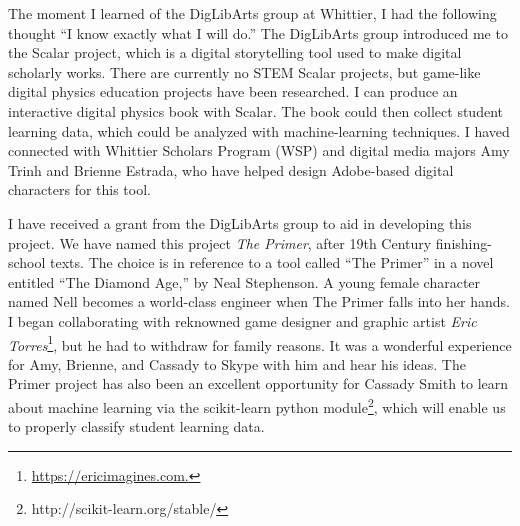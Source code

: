 \documentclass[../../main.tex]{subfiles}
\begin{document}
The moment I learned of the DigLibArts group at Whittier, I had the following thought ``I know exactly what I will do.''  The DigLibArts group introduced me to the Scalar project, which is a digital storytelling tool used to make digital scholarly works.  There are currently no STEM Scalar projects, but game-like digital physics education projects have been researched\cite{orban2017a}.  I can produce an interactive digital physics book with Scalar.  The book could then collect student learning data, which could be analyzed with machine-learning techniques.  I haved connected with Whittier Scholars Program (WSP) and digital media majors Amy Trinh and Brienne Estrada, who have helped design Adobe-based digital characters for this tool. \\ \hspace{0.1cm}

I have received a grant from the DigLibArts group to aid in developing this project.  We have named this project \textit{The Primer}, after 19th Century finishing-school texts.  The choice is in reference to a tool called ``The Primer'' in a novel entitled ``The Diamond Age,'' by Neal Stephenson.  A young female character named Nell becomes a world-class engineer when The Primer falls into her hands.  I began collaborating with reknowned game designer and graphic artist \textit{Eric Torres}\footnote{\url{https://ericimagines.com.}}, but he  had to withdraw for family reasons.  It was a wonderful experience for Amy, Brienne, and Cassady to Skype with him and hear his ideas. The Primer project has also been an excellent opportunity for Cassady Smith to learn about machine learning via the scikit-learn python module\footnote{http://scikit-learn.org/stable/}, which will enable us to properly classify student learning data.
\end{document}
